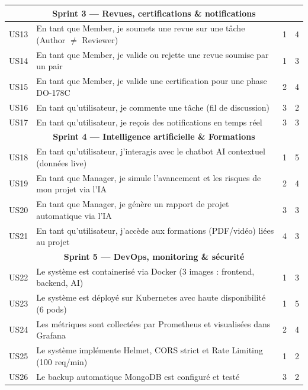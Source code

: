 \begin{longtable}{|c|p{7cm}|c|c|}
  \multicolumn{4}{|c|}{\cellcolor{primaryblue!20}\textbf{Sprint 3 — Revues, certifications \& notifications}} \\
  \hline
  US13 & En tant que Member, je soumets une revue sur une tâche (Author $\neq$ Reviewer) & 1 & 4 \\
  \hline
  US14 & En tant que Member, je valide ou rejette une revue soumise par un pair & 1 & 3 \\
  \hline
  US15 & En tant que Member, je valide une certification pour une phase DO-178C & 2 & 4 \\
  \hline
  US16 & En tant qu'utilisateur, je commente une tâche (fil de discussion) & 3 & 2 \\
  \hline
  US17 & En tant qu'utilisateur, je reçois des notifications en temps réel & 3 & 3 \\
  \hline

  \multicolumn{4}{|c|}{\cellcolor{primaryblue!20}\textbf{Sprint 4 — Intelligence artificielle \& Formations}} \\
  \hline
  US18 & En tant qu'utilisateur, j'interagis avec le chatbot AI contextuel (données live) & 1 & 5 \\
  \hline
  US19 & En tant que Manager, je simule l'avancement et les risques de mon projet via l'IA & 2 & 4 \\
  \hline
  US20 & En tant que Manager, je génère un rapport de projet automatique via l'IA & 3 & 3 \\
  \hline
  US21 & En tant qu'utilisateur, j'accède aux formations (PDF/vidéo) liées au projet & 4 & 3 \\
  \hline

  \multicolumn{4}{|c|}{\cellcolor{primaryblue!20}\textbf{Sprint 5 — DevOps, monitoring \& sécurité}} \\
  \hline
  US22 & Le système est containerisé via Docker (3 images : frontend, backend, AI) & 1 & 3 \\
  \hline
  US23 & Le système est déployé sur Kubernetes avec haute disponibilité (6 pods) & 1 & 5 \\
  \hline
  US24 & Les métriques sont collectées par Prometheus et visualisées dans Grafana & 2 & 4 \\
  \hline
  US25 & Le système implémente Helmet, CORS strict et Rate Limiting (100 req/min) & 1 & 2 \\
  \hline
  US26 & Le backup automatique MongoDB est configuré et testé & 3 & 2 \\
  \hline
\end{longtable}



